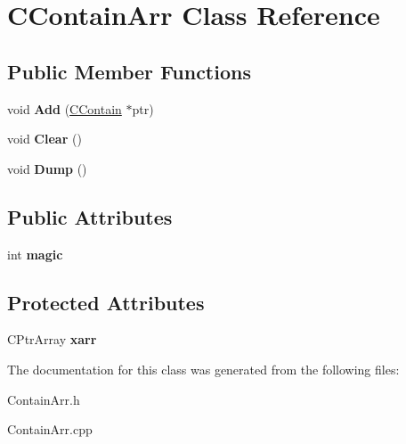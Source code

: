 \hypertarget{class_c_contain_arr}{\section{C\-Contain\-Arr Class Reference}
\label{class_c_contain_arr}
}
\subsection*{Public Member Functions}
\begin{DoxyCompactItemize}
\item 
\hypertarget{class_c_contain_arr_a10aedeb99fe959d4286c692c1733352b}{void {\bfseries Add} (\hyperlink{class_c_contain}{C\-Contain} $\ast$ptr)}\label{class_c_contain_arr_a10aedeb99fe959d4286c692c1733352b}

\item 
\hypertarget{class_c_contain_arr_a42106ee940e4d6e9160ce14d51d45bfe}{void {\bfseries Clear} ()}\label{class_c_contain_arr_a42106ee940e4d6e9160ce14d51d45bfe}

\item 
\hypertarget{class_c_contain_arr_af808f0977744127a24a9f523c9170fad}{void {\bfseries Dump} ()}\label{class_c_contain_arr_af808f0977744127a24a9f523c9170fad}

\end{DoxyCompactItemize}
\subsection*{Public Attributes}
\begin{DoxyCompactItemize}
\item 
\hypertarget{class_c_contain_arr_a0f95b18eac5389c9c9244a9380885935}{int {\bfseries magic}}\label{class_c_contain_arr_a0f95b18eac5389c9c9244a9380885935}

\end{DoxyCompactItemize}
\subsection*{Protected Attributes}
\begin{DoxyCompactItemize}
\item 
\hypertarget{class_c_contain_arr_aad1989626b2bdebfeac37a10b574f105}{C\-Ptr\-Array {\bfseries xarr}}\label{class_c_contain_arr_aad1989626b2bdebfeac37a10b574f105}

\end{DoxyCompactItemize}


The documentation for this class was generated from the following files\-:\begin{DoxyCompactItemize}
\item 
Contain\-Arr.\-h\item 
Contain\-Arr.\-cpp\end{DoxyCompactItemize}
